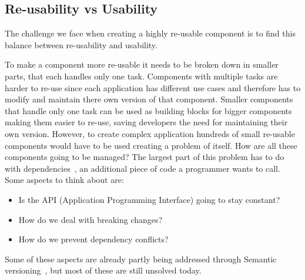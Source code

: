 \subsection{Re-usability vs Usability}
%

The challenge we face when creating a highly re-usable component is to find this balance between re-usability and usability.

To make a component more re-usable it needs to be broken down in smaller parts, that each handles only one task. Components with multiple tasks are harder to re-use since each application has different use cases and therefore has to modify and maintain there own version of that component. Smaller components that handle only one task can be used as building blocks for bigger components making them easier to re-use, saving developers the need for maintaining their own version. However, to create complex application hundreds of small re-usable components would have to be used creating a problem of itself. How are all these components going to be managed? The largest part of this problem has to do with dependencies~\cite{reusedreamdead}, an additional piece of code a programmer wants to call. Some aspects to think about are:
\begin{itemize}
	\item Is the API (Application Programming Interface) going to stay constant?
	\item How do we deal with breaking changes?
	\item How do we prevent dependency conflicts?
\end{itemize}

\noindent Some of these aspects are already partly being addressed through Semantic versioning~\cite{preston2013semantic}, but most of these are still unsolved today.

